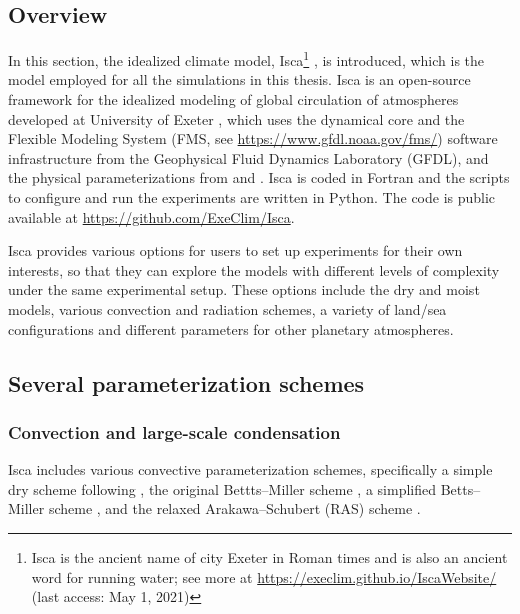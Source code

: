 \subsection{Overview}

In this section, the idealized climate model, Isca\footnote{Isca is the ancient name of city Exeter in Roman times and is also an ancient word for running water; see more at \url{https://execlim.github.io/IscaWebsite/} (last access: May 1, 2021)} \citep{Vallis2018}, is introduced, which is the model employed for all the simulations in this thesis. Isca is an open-source framework for the idealized modeling of global circulation of atmospheres developed at University of Exeter \citep{Vallis2018}, which uses the dynamical core and the Flexible Modeling System (FMS, see \url{https://www.gfdl.noaa.gov/fms/}) software infrastructure from the Geophysical Fluid Dynamics Laboratory (GFDL), and the physical parameterizations from \citet{Frierson2006} and \citet{Frierson2007}. Isca is coded in Fortran and the scripts to configure and run the experiments are written in Python. The code is public available at \url{https://github.com/ExeClim/Isca}.

Isca provides various options for users to set up experiments for their own interests, so that they can explore the models with different levels of complexity under the same experimental setup. These options include the dry and moist models, various convection and radiation schemes, a variety of land/sea configurations and different parameters for other planetary atmospheres.

\subsection{Several parameterization schemes}

\subsubsection{Convection and large-scale condensation}

Isca includes various convective parameterization schemes, specifically a simple dry scheme following \cite{Walker2006eddy}, the original Bettts--Miller scheme \citep[a covective relaxation scheme;][]{Betts1986,BettsMiller1986}, a simplified Betts--Miller scheme \citep[SBM;][]{Frierson2007}, and the relaxed Arakawa--Schubert (RAS) scheme \citep[a mass-flux based scheme;][]{Moorthi1992relaxed}.

